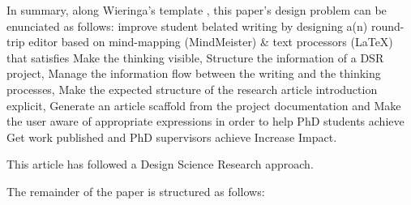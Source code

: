 \documentclass{article}
\begin{document}
In summary, along Wieringa's template \cite{Wieringa2014}, this paper's design problem can be enunciated as follows: 
improve student belated writing
by designing a(n) round-trip editor based on mind-mapping (MindMeister) & text processors (LaTeX)
that satisfies Make the thinking visible, Structure the information of a DSR project, Manage the information flow between the writing and the thinking processes, Make the expected structure of the research article introduction explicit, Generate an article scaffold from the project documentation and Make the user aware of appropriate expressions
in order to help PhD students achieve Get work published and PhD supervisors achieve Increase Impact. 
    

      
This article has followed a Design Science Research approach.

The remainder of the paper is structured as follows: 

    
      


\end{document}
